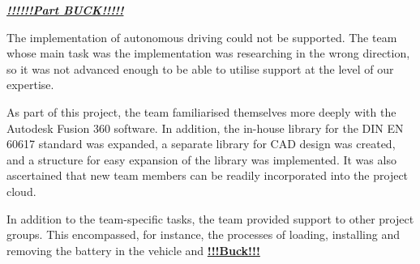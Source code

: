 \textbf{\textit{\underline{!!!!!!Part BUCK!!!!!}}}

The implementation of autonomous driving could not be supported. The team whose main task was the implementation was researching in the wrong direction, so it was not advanced enough to be able to utilise support at the level of our expertise.

As part of this project, the team familiarised themselves more deeply with the Autodesk Fusion 360 software. In addition, the in-house library for the DIN EN 60617 standard was expanded, a separate library for CAD design was created, and a structure for easy expansion of the library was implemented. It was also ascertained that new team members can be readily incorporated into the project cloud.


In addition to the team-specific tasks, the team provided support to other project groups. This encompassed, for instance, the processes of loading, installing and removing the battery in the vehicle and \textbf{\underline{!!!Buck!!!}}

